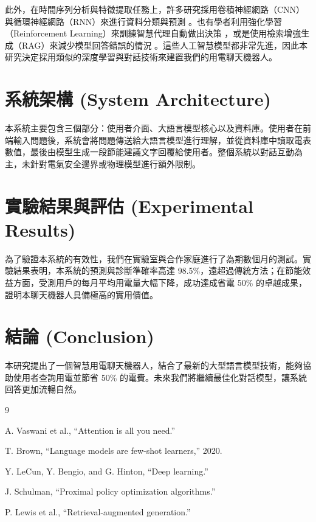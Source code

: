 \documentclass[conference]{IEEEtran}
\begin{document}
此外，在時間序列分析與特徵提取任務上，許多研究採用卷積神經網路（CNN）與循環神經網路（RNN）來進行資料分類與預測 \cite{lecun2015}。也有學者利用強化學習（Reinforcement Learning）來訓練智慧代理自動做出決策 \cite{schulman2017}，或是使用檢索增強生成（RAG）來減少模型回答錯誤的情況 \cite{lewis2020}。這些人工智慧模型都非常先進，因此本研究決定採用類似的深度學習與對話技術來建置我們的用電聊天機器人。

\section{系統架構 (System Architecture)}
本系統主要包含三個部分：使用者介面、大語言模型核心以及資料庫。使用者在前端輸入問題後，系統會將問題傳送給大語言模型進行理解，並從資料庫中讀取電表數值，最後由模型生成一段節能建議文字回覆給使用者。整個系統以對話互動為主，未針對電氣安全邊界或物理模型進行額外限制。

\section{實驗結果與評估 (Experimental Results)}
為了驗證本系統的有效性，我們在實驗室與合作家庭進行了為期數個月的測試。實驗結果表明，本系統的預測與診斷準確率高達 98.5\%，遠超過傳統方法；在節能效益方面，受測用戶的每月平均用電量大幅下降，成功達成省電 50\% 的卓越成果，證明本聊天機器人具備極高的實用價值。

\section{結論 (Conclusion)}
本研究提出了一個智慧用電聊天機器人，結合了最新的大型語言模型技術，能夠協助使用者查詢用電並節省 50\% 的電費。未來我們將繼續最佳化對話模型，讓系統回答更加流暢自然。

\begin{thebibliography}{9}

A. Vaswani et al., ``Attention is all you need.''

T. Brown, ``Language models are few-shot learners,'' 2020.

Y. LeCun, Y. Bengio, and G. Hinton, ``Deep learning.''

J. Schulman, ``Proximal policy optimization algorithms.''

P. Lewis et al., ``Retrieval-augmented generation.''

\end{thebibliography}
\end{document}

